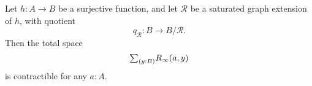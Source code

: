 \begin{comment}
\begin{proof}
This is intuitively true because it works on the defining type sequences, and limits of natural embeddings are embeddings. [TODO]
\end{proof}

The type of sequences of abstract graph extensions can be presented as the coinductive type
\begin{equation*}
\mathsf{seq}(B,h,\mathcal{R})\to\sm{(B',h',\mathcal{S}):\mathsf{gphExt}}{(i,H,\epsilon):(B,h,\mathcal{R})\to(B',h',\mathcal{S})}\mathsf{seq}(B',h',\mathcal{S}).
\end{equation*}
We use the following lemma to conclude that the map
\begin{equation*}
\mathsf{sat}(\mathcal{R})\to\mathsf{seq}(B,h,\mathcal{R})
\end{equation*}
is an embedding.

\begin{lem}
The map
\begin{equation*}
\varphi:\mathsf{presat}(\mathcal{R})\to \sm{(B',h',\mathcal{S}):\mathsf{gphExt}}(B,h,\mathcal{R})\to(B',h',\mathcal{S})
\end{equation*}
given by
\begin{equation*}
\cdots
\end{equation*}
is an embedding.
\end{lem}

\begin{proof}
Let $(i,H,\alpha):(B,h,\mathcal{R})\to(B',h',\mathcal{R}')$, and suppose that the fiber of $\varphi$ at $(B',h',\mathcal{R}',i,H,\alpha)$ is merely inhabited. 
\end{proof}

\begin{cor}
The map
\begin{equation*}
\mathsf{sat}(\mathcal{R})\to\mathsf{seq}(B,h,\mathcal{R})
\end{equation*}
defined in \autoref{defn:seq_sat} is an embedding.
\end{cor}
\end{comment}

\begin{prp}
Let $h:A\to B$ be a surjective function, and let $\mathcal{R}$ be a saturated graph extension of $h$, with quotient
\begin{equation*}
q_{\mathcal{R}}:B\to B/\mathcal{R}.
\end{equation*}
Then the total space
\begin{equation*}
\sm{y:B}R_\infty(a,y)
\end{equation*}
is contractible for any $a:A$.
\end{prp}

